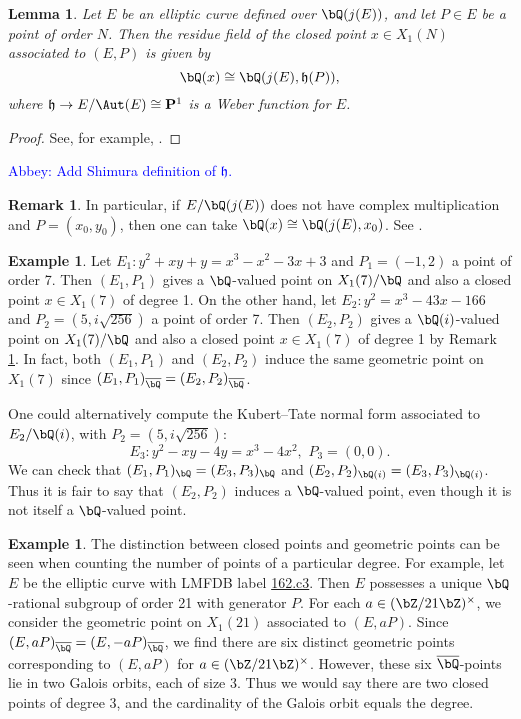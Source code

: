 \documentclass[11pt,reqno]{amsart}
\theoremstyle{plain}
\newtheorem{lemma}[theorem]{Lemma}
\theoremstyle{definition}
\newtheorem{remark}[theorem]{Remark}
\newtheorem{example}[theorem]{Example}
\newcommand{\Q}{\bQ}
\newcommand{\Z}{\bZ}
\newcommand{\abbey}[1]{\textcolor{blue}{Abbey: #1}}
\newcommand{\abedit}[1]{{\color{blue} #1}}
\begin{document}
\begin{lemma}\label{ResidueFieldLemma}
Let $E$ be an elliptic curve defined over $\Q(j(E))$, and let $P \in E$ be a point of order $N$. Then the residue field of the closed point $x \in X_1(N)$ associated to $(E,P)$ is given by
\[
\Q(x)\cong\Q(j(E),\mathfrak{h}(P)),
\]
where $\mathfrak{h} \rightarrow E/\Aut(E) \cong \mathbf{P}^1$ is a Weber function for $E$.
\end{lemma}

\begin{proof}
See, for example, \cite[Lemma 2.5]{BourdonNajman2021}.%
\end{proof}

\abbey{Add Shimura definition of $\mathfrak{h}$.}

\begin{remark}\label{ResidueFieldRmk} In particular, if $E/\Q(j(E))$ does not have complex multiplication and $P=(x_0,y_0)$, then one can take $\Q(x)\cong\Q(j(E),x_0)$. See \cite[p. 107]{shimura}.
\end{remark}
\begin{example}
Let $E_1:y^2+xy+y=x^3-x^2-3x+3$ and $P_1=(-1,2)$ a point of order 7. Then $(E_1,P_1)$ gives a $\Q$-valued point on $X_1(7)/\Q$ and also a closed point $x\in X_1(7)$ of degree 1. On the other hand, let $E_2:y^2=x^3-43x-166$ and $P_2=(5,i\sqrt{256})$ a point of order 7. Then $(E_2,P_2)$ gives a $\Q(i)$-valued point on $X_1(7)/\Q$ and also a closed point $x\in X_1(7)$ of degree 1 by \abedit{Remark \ref{ResidueFieldRmk}}. In fact, both $(E_1,P_1)$ and $(E_2,P_2)$ induce the same geometric point on $X_1(7)$ since $(E_1,P_1)_{\overline{\Q}}=(E_2,P_2)_{\overline{\Q}}$.

One could alternatively compute the Kubert--Tate normal form associated to $E_2/\Q(i)$, with $P_2=(5,i\sqrt{256})$:
\[E_3: y^2-xy-4y=x^3-4x^2,\, \, P_3=(0,0).
\]
We can check that $(E_1,P_1)_{\Q}=(E_3,P_3)_{\Q}$ and $(E_2,P_2)_{\Q(i)} =(E_3,P_3)_{\Q(i)}$. Thus it is fair to say that $(E_2,P_2)$ induces a $\Q$-valued point, even though it is not itself a $\Q$-valued point.
\end{example}

\begin{example}
The distinction between closed points and geometric points can be seen when counting the number of points of a particular degree. For example, let $E$ be the elliptic curve with LMFDB label \href{https://www.lmfdb.org/EllipticCurve/Q/162/c/3}{162.c3}. Then $E$ possesses a unique $\Q$-rational subgroup of order 21 with generator $P$. For each $a \in (\Z/21\Z)^{\times}$, we consider the geometric point on $X_1(21)$ associated to $(E,aP)$. Since $(E,aP)_{\overline{\Q}}=(E,-aP)_{\overline{\Q}}$, we find there are six distinct geometric points corresponding to $(E,aP)$ for $a \in (\Z/21\Z)^{\times}$. However, these six $\overline{\Q}$-points lie in two Galois orbits, each of size 3. Thus we would say there are two closed points of degree 3, and the cardinality of the Galois orbit equals the degree.
\end{example}
\end{document}
